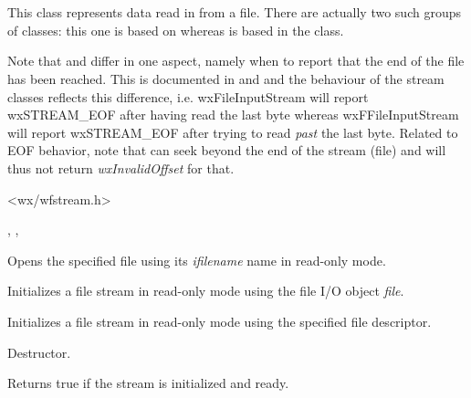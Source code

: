 \section{}\label{wxfileinputstream}

This class represents data read in from a file. There are actually
two such groups of classes: this one is based on  
whereas  is based in
the  class.

Note that  and  differ
in one aspect, namely when to report that the end of the file has been
reached. This is documented in  and 
 and the behaviour of the stream
classes reflects this difference, i.e. wxFileInputStream will report
wxSTREAM\_EOF after having read the last byte whereas wxFFileInputStream
will report wxSTREAM\_EOF after trying to read {\it past} the last byte.
Related to EOF behavior, note that  
can seek beyond the end of the stream (file) and will thus not return 
{\it wxInvalidOffset} for that.




<wx/wfstream.h>


, , 




Opens the specified file using its {\it ifilename} name in read-only mode.


Initializes a file stream in read-only mode using the file I/O object {\it file}.


Initializes a file stream in read-only mode using the specified file descriptor.



Destructor.



Returns true if the stream is initialized and ready.

